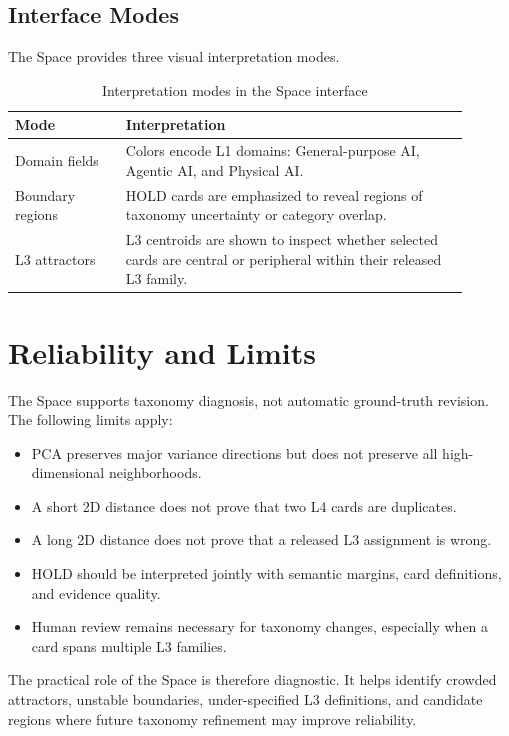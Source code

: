 \documentclass[11pt,a4paper]{article}
\begin{document}
\subsection{Interface Modes}

The Space provides three visual interpretation modes.

\begin{table}[h]
\centering
\caption{Interpretation modes in the Space interface}
\begin{tabular}{p{0.22\linewidth}p{0.68\linewidth}}
\toprule
Mode & Interpretation \\
\midrule
Domain fields & Colors encode L1 domains: General-purpose AI, Agentic AI, and Physical AI. \\
Boundary regions & HOLD cards are emphasized to reveal regions of taxonomy uncertainty or category overlap. \\
L3 attractors & L3 centroids are shown to inspect whether selected cards are central or peripheral within their released L3 family. \\
\bottomrule
\end{tabular}
\end{table}

\section{Reliability and Limits}

The Space supports taxonomy diagnosis, not automatic ground-truth revision. The following limits apply:
\begin{itemize}
  \item PCA preserves major variance directions but does not preserve all high-dimensional neighborhoods.
  \item A short 2D distance does not prove that two L4 cards are duplicates.
  \item A long 2D distance does not prove that a released L3 assignment is wrong.
  \item HOLD should be interpreted jointly with semantic margins, card definitions, and evidence quality.
  \item Human review remains necessary for taxonomy changes, especially when a card spans multiple L3 families.
\end{itemize}

The practical role of the Space is therefore diagnostic. It helps identify crowded attractors, unstable boundaries, under-specified L3 definitions, and candidate regions where future taxonomy refinement may improve reliability.
\end{document}
